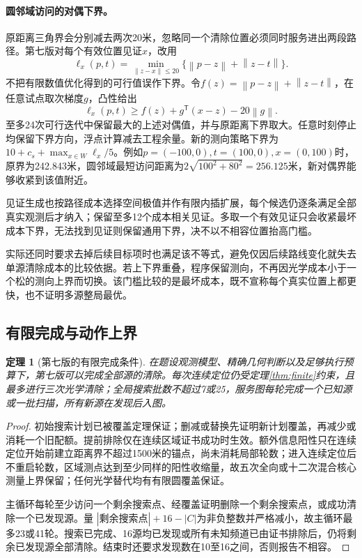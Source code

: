 \documentclass[UTF8,a4paper,zihao=-4,fontset=windows]{ctexart}
\newtheorem{theorem}{定理}[section]
\newcommand{\norm}[1]{\left\lVert#1\right\rVert}
\begin{document}
\paragraph{圆邻域访问的对偶下界。}
原距离三角界会分别减去两次20米，忽略同一个清除位置必须同时服务进出两段路径。第七版对每个有效位置见证$x$，改用
\begin{equation}
\ell_x(p,t)=\min_{\norm{z-x}\le20}
\{\norm{p-z}+\norm{z-t}\}.
\end{equation}
不把有限数值优化得到的可行值误作下界。令$f(z)=\norm{p-z}+\norm{z-t}$，在任意试点取次梯度$g$，凸性给出
\begin{equation}
\ell_x(p,t)\ge f(z)+g^\mathsf T(x-z)-20\norm{g}.
\end{equation}
至多24次可行迭代中保留最大的上述对偶值，并与原距离下界取大。任意时刻停止均保留下界方向，浮点计算减去工程余量。新的测向策略下界为$10+c_s+\max_{x\in W}\ell_x/5$。例如$p=(-100,0),t=(100,0),x=(0,100)$时，原界为242.843米，圆邻域最短访问距离为$2\sqrt{100^2+80^2}=256.125$米，新对偶界能够收紧到该值附近。

见证生成也按路径成本选择空间极值并作有限内插扩展，每个候选仍逐条满足全部真实观测后才纳入；保留至多12个成本相关见证。多取一个有效见证只会收紧最坏成本下界，无法找到见证则保留通用下界，决不以不相容位置抬高门槛。

实际还同时要求去掉后续目标项时也满足该不等式，避免仅因后续路线变化就失去单源清除成本的比较依据。若上下界重叠，程序保留测向，不再因光学成本小于一个松的测向上界而切换。该门槛比较的是最坏成本，既不宣称每个真实位置上都更快，也不证明多源整局最优。

\subsection{有限完成与动作上界}
\begin{theorem}[第七版的有限完成条件]
在题设观测模型、精确几何判断以及足够执行预算下，第七版可以完成全部源的清除。每次连续定位仍受定理\ref{thm:finite}约束，且最多进行三次光学清除；全局搜索批数不超过7或25，服务图每轮完成一个已知源或一批扫描，所有新源在发现后入图。
\end{theorem}
\begin{proof}
初始搜索计划已被覆盖定理保证；删减或替换先证明新计划覆盖，再减少或消耗一个旧配额。提前排除仅在连续区域证书成功时生效。额外信息阳性只在连续定位开始前建立距离界不超过1500米的锚点，尚未消耗局部轮数；进入连续定位后不重启轮数，区域测点达到至少同样的阳性收缩量，故五次全向或十二次混合核心测量上界保留；任何光学替代均有有限圆覆盖保证。

主循环每轮至少访问一个剩余搜索点、经覆盖证明删除一个剩余搜索点，或成功清除一个已发现源。量
$|\text{剩余搜索点}|+16-|C|$为非负整数并严格减小，故主循环最多23或41轮。搜索已完成、16源均已发现或所有未知频道已由证书排除后，仍将剩余已发现源全部清除。结束时还要求发现数在10至16之间，否则报告不相容。
\end{proof}
\end{document}
